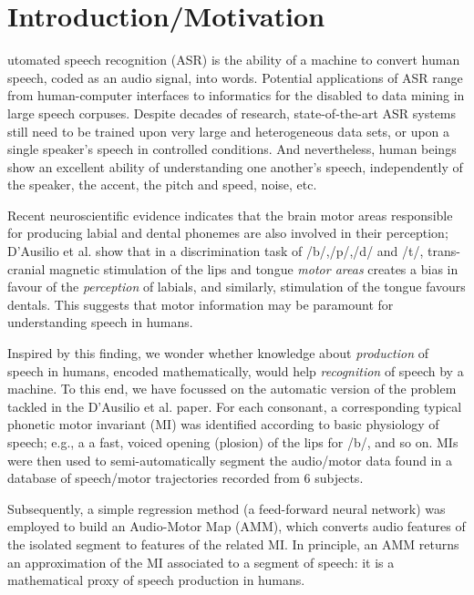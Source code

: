 \section{Introduction/Motivation}
\label{sec:intro}

utomated speech recognition (ASR) is the ability of a machine
to convert human speech, coded as an audio signal, into words.
Potential applications of ASR range from human-computer interfaces
to informatics for the disabled to data mining in large speech corpuses.
Despite decades of research, state-of-the-art ASR
systems still need to be trained upon very large and heterogeneous data sets, or upon
a single speaker's speech in controlled conditions.
And nevertheless, human beings show an excellent ability
of understanding one another's speech, independently of the speaker, the
accent, the pitch and speed, noise, etc.

Recent neuroscientific
evidence indicates that the brain motor areas responsible for producing labial
and dental phonemes are also involved in their perception; D'Ausilio et al. \cite{dausilio}
show that in a discrimination task of /b/,/p/,/d/ and /t/, trans-cranial magnetic
stimulation of the lips and tongue \emph{motor areas} creates a bias in favour
of the \emph{perception} of labials, and similarly, stimulation of the tongue
favours dentals. This suggests that motor information may be paramount for
understanding speech in humans.

Inspired by this finding, we wonder whether knowledge about \emph{production}
of speech in humans, encoded mathematically, would help \emph{recognition}
of speech by a machine. To this end, we have focussed on the automatic version of
the problem tackled in the D'Ausilio et al. paper. For each consonant,
a corresponding typical phonetic motor invariant (MI) was
identified according to basic physiology of speech;
e.g., a a fast, voiced opening (plosion) of the lips for /b/, and so on.
MIs were then used to semi-automatically segment the audio/motor data found in a
database of speech/motor trajectories recorded from $6$ subjects.

Subsequently, a simple regression method (a feed-forward neural network) was employed
to build an Audio-Motor Map (AMM), which converts audio features of the isolated segment to
features of the related MI. In principle, an AMM returns an approximation of the MI
associated to a segment of speech: it is a mathematical proxy of speech production
in humans.

